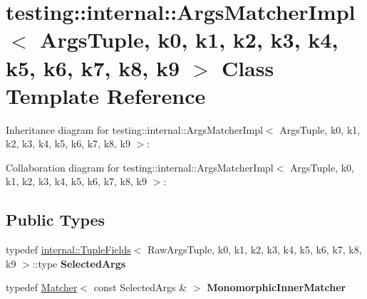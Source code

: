 \hypertarget{classtesting_1_1internal_1_1ArgsMatcherImpl}{}\section{testing\+:\+:internal\+:\+:Args\+Matcher\+Impl$<$ Args\+Tuple, k0, k1, k2, k3, k4, k5, k6, k7, k8, k9 $>$ Class Template Reference}
\label{classtesting_1_1internal_1_1ArgsMatcherImpl}


Inheritance diagram for testing\+:\+:internal\+:\+:Args\+Matcher\+Impl$<$ Args\+Tuple, k0, k1, k2, k3, k4, k5, k6, k7, k8, k9 $>$\+:


Collaboration diagram for testing\+:\+:internal\+:\+:Args\+Matcher\+Impl$<$ Args\+Tuple, k0, k1, k2, k3, k4, k5, k6, k7, k8, k9 $>$\+:
\subsection*{Public Types}
\begin{DoxyCompactItemize}
\item 
\mbox{\label{classtesting_1_1internal_1_1ArgsMatcherImpl_ab061679f6251e56ccbedaf0c316d00ff}} 
typedef \hyperlink{classtesting_1_1internal_1_1TupleFields}{internal\+::\+Tuple\+Fields}$<$ Raw\+Args\+Tuple, k0, k1, k2, k3, k4, k5, k6, k7, k8, k9 $>$\+::type {\bfseries Selected\+Args}
\item 
\mbox{\label{classtesting_1_1internal_1_1ArgsMatcherImpl_ab90d2c074b2072d6c39bf26209fb941f}} 
typedef \hyperlink{classtesting_1_1Matcher}{Matcher}$<$ const Selected\+Args \& $>$ {\bfseries Monomorphic\+Inner\+Matcher}
\end{DoxyCompactItemize}
